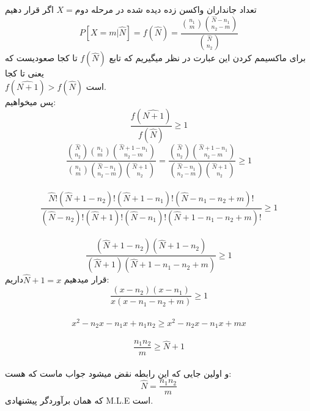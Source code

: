 \problem{}
اگر قرار دهیم $X =\text{تعداد جانداران واکسن زده دیده شده در مرحله دوم}$
\[
    P[X = m|\hat{N}] =f(\hat{N}) =  \frac{\binom{n_1}{m}\binom{\hat{N}-n_1}{n_2-m}}{\binom{\hat{N}}{n_2}}  
\]
برای ماکسیمم کردن این عبارت در نظر میگیریم که تابع
$f(\hat{N})$ تا کجا صعودیست 
که یعنی تا کجا \\
$f(\hat{N+1}) > f(\hat{N})$
است.\\
پس میخواهیم:\\
\[
    \frac{f(\hat{N+1})}{f(\hat{N})} \geq 1
\]
\[
    \frac{\binom{\hat{N}}{n_2}\binom{n_1}{m}\binom{\hat{N}+1-n_1}{n_2-m}}
    {\binom{n_1}{m}\binom{\hat{N}-n_1}{n_2-m}\binom{\hat{N}+1}{n_2}} = 
    \frac{\binom{\hat{N}}{n_2}\binom{\hat{N}+1-n_1}{n_2-m}}
    {\binom{\hat{N}-n_1}{n_2-m}\binom{\hat{N}+1}{n_2}}  \geq 1
\]\\
\[
    \frac{\hat{N}!(\hat{N}+1-n_2)!(\hat{N}+1-n_1)!(\hat{N}-n_1-n_2+m)!}
    {(\hat{N}-n_2)!(\hat{N}+1)!(\hat{N}-n_1)!(\hat{N}+1-n_1-n_2+m)!} \geq1
\]\\
\[
    \frac{(\hat{N}+1-n_2)(\hat{N}+1-n_2)}
    {(\hat{N}+1)(\hat{N}+1-n_1-n_2+m)} \geq1
\]
قرار میدهیم $\hat{N}+1 = x$داریم:\\
\[
    \frac{(x-n_2)(x-n_1)}
    {x(x-n_1-n_2+m)} \geq 1
\]
\\
\[
    x^2-n_2x-n_1x+n_1n_2 \geq x^2-n_2x-n_1x+mx 
\]\\
\[
    \frac{n_1n_2}{m}\geq \hat{N}+1
\]\\
و اولین جایی که این رابطه نقض میشود جواب ماست که هست:\\
\[
    \hat{N} = \frac{n_1n_2}{m}  
\]
که همان برآوردگر پیشنهادی M.L.E است.